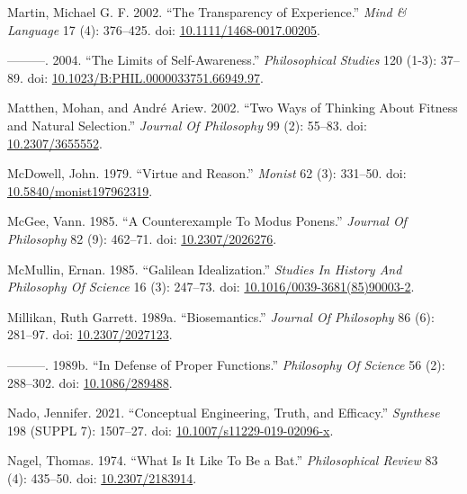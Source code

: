 \documentclass[
  10pt,
  letterpaper,
  DIV=11,
  numbers=noendperiod,
  twoside]{scrartcl}
\newlength{\cslhangindent}
\newenvironment{CSLReferences}[2] %
 {\begin{list}{}{%
  \setlength{\itemindent}{0pt}
  \setlength{\leftmargin}{0pt}
  \setlength{\parsep}{0pt}
  \ifodd #1
   \setlength{\leftmargin}{\cslhangindent}
   \setlength{\itemindent}{-1\cslhangindent}
  \fi
  \setlength{\itemsep}{#2\baselineskip}}}
 {\end{list}}
\begin{document}
\begin{CSLReferences}{1}{0}
Martin, Michael G. F. 2002. {``The Transparency of Experience.''}
\emph{Mind \& Language} 17 (4): 376--425. doi:
\href{https://doi.org/10.1111/1468-0017.00205}{10.1111/1468-0017.00205}.

---------. 2004. {``The Limits of Self-Awareness.''} \emph{Philosophical
Studies} 120 (1-3): 37--89. doi:
\href{https://doi.org/10.1023/B:PHIL.0000033751.66949.97}{10.1023/B:PHIL.0000033751.66949.97}.

Matthen, Mohan, and André Ariew. 2002. {``Two Ways of Thinking About
Fitness and Natural Selection.''} \emph{Journal Of Philosophy} 99 (2):
55--83. doi: \href{https://doi.org/10.2307/3655552}{10.2307/3655552}.

McDowell, John. 1979. {``Virtue and Reason.''} \emph{Monist} 62 (3):
331--50. doi:
\href{https://doi.org/10.5840/monist197962319}{10.5840/monist197962319}.

McGee, Vann. 1985. {``A Counterexample To Modus Ponens.''} \emph{Journal
Of Philosophy} 82 (9): 462--71. doi:
\href{https://doi.org/10.2307/2026276}{10.2307/2026276}.

McMullin, Ernan. 1985. {``Galilean Idealization.''} \emph{Studies In
History And Philosophy Of Science} 16 (3): 247--73. doi:
\href{https://doi.org/10.1016/0039-3681(85)90003-2}{10.1016/0039-3681(85)90003-2}.

Millikan, Ruth Garrett. 1989a. {``Biosemantics.''} \emph{Journal Of
Philosophy} 86 (6): 281--97. doi:
\href{https://doi.org/10.2307/2027123}{10.2307/2027123}.

---------. 1989b. {``In Defense of Proper Functions.''} \emph{Philosophy
Of Science} 56 (2): 288--302. doi:
\href{https://doi.org/10.1086/289488}{10.1086/289488}.

Nado, Jennifer. 2021. {``Conceptual Engineering, Truth, and Efficacy.''}
\emph{Synthese} 198 (SUPPL 7): 1507--27. doi:
\href{https://doi.org/10.1007/s11229-019-02096-x}{10.1007/s11229-019-02096-x}.

Nagel, Thomas. 1974. {``What Is It Like To Be a Bat.''}
\emph{Philosophical Review} 83 (4): 435--50. doi:
\href{https://doi.org/10.2307/2183914}{10.2307/2183914}.


\end{CSLReferences}
\end{document}
